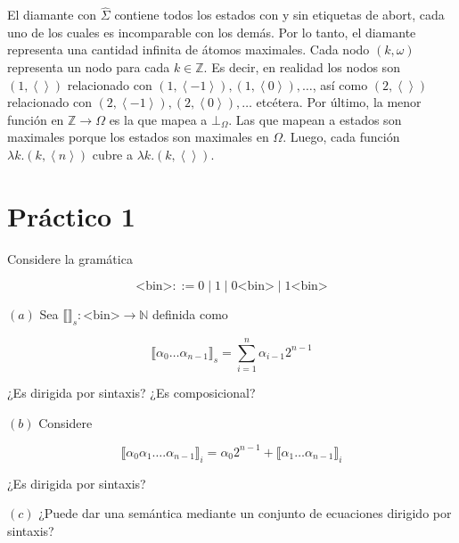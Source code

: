 \documentclass[a4paper, 12pt]{article}
\begin{document}
El diamante con $\hat{\Sigma}$ contiene todos los estados con y sin etiquetas de
abort, cada uno de los cuales es incomparable con los demás. Por lo tanto, el
diamante representa una cantidad infinita de átomos maximales. Cada nodo $(k, \omega)$
representa un nodo para cada $k \in \mathbb{Z}$. Es decir, en realidad los
nodos son $(1, \left< \right>)$ relacionado con $(1, \left< -1 \right>), (1,
\left< 0 \right>), \ldots$, así como $(2, \left< \right>)$ relacionado con $(2,
\left< -1 \right>), (2, \left< 0 \right>), \ldots$ etcétera. Por último, la
menor función en $\mathbb{Z} \to \Omega$ es la que mapea a $\bot_\Omega$. Las
que mapean a estados son maximales porque los estados son maximales en $\Omega$.
Luego, cada función $\lambda k.\left( k, \left< n\right> \right) $ cubre a
$\lambda k . (k, \left< \right>)$.






















\pagebreak



\section{Práctico 1}

\begin{myframe}
  Considere la gramática 

  \begin{equation*}
    \text{<bin>} ::= 0 \mid 1 \mid 0\text{<bin>} \mid 1\text{<bin>}
  \end{equation*}

  $(a)$ Sea $\llbracket  \rrbracket_s : \text{<bin>} \to \mathbb{N}$ definida
  como 

  \begin{equation*}
    \llbracket \alpha_0\ldots\alpha_{n-1} \rrbracket_{s} = \sum_{i=1}^n
    \alpha_{i-1}2^{n-1}
  \end{equation*}

  ¿Es dirigida por sintaxis? ¿Es composicional? 

  $(b)$ Considere 

  \begin{equation*}
    \llbracket \alpha_0 \alpha_1 \ldots. \alpha_{n-1} \rrbracket_i =
    \alpha_{0} 2^{n-1} + \llbracket \alpha_1 \ldots \alpha_{n-1} \rrbracket_i
  \end{equation*}

  ¿Es dirigida por sintaxis? 

  $(c)$ ¿Puede dar una semántica mediante un conjunto de ecuaciones dirigido por
  sintaxis?
\end{myframe}
\end{document}
